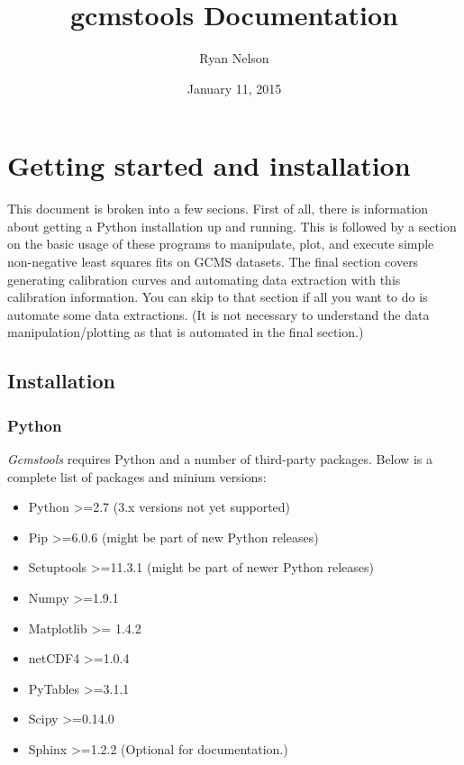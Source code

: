 \documentclass[letterpaper,10pt,english]{sphinxmanual}
\title{gcmstools Documentation}
\date{January 11, 2015}
\author{Ryan Nelson}
\begin{document}
\maketitle
\tableofcontents
{}\label{index::doc}



\chapter{Getting started and installation}
\label{intro:getting-started-and-installation}\label{intro:gcmstools-documentation}\label{intro::doc}
This document is broken into a few secions. First of all, there is information
about getting a Python installation up and running. This is followed by a
section on the basic usage of these programs to manipulate, plot, and execute
simple non-negative least squares fits on GCMS datasets. The final section
covers generating calibration curves and automating data extraction with this
calibration information. You can skip to that section if all you want to do is
automate some data extractions. (It is not necessary to understand the data
manipulation/plotting as that is automated in the final section.)


\section{Installation}
\label{intro:installation}

\subsection{Python}
\label{intro:python}
\emph{Gcmstools} requires Python and a number of third-party packages. Below is a
complete list of packages and minium versions:
\begin{itemize}
\item {} 
Python \textgreater{}=2.7 (3.x versions not yet supported)

\item {} 
Pip \textgreater{}=6.0.6 (might be part of new Python releases)

\item {} 
Setuptools \textgreater{}=11.3.1 (might be part of newer Python releases)

\item {} 
Numpy \textgreater{}=1.9.1

\item {} 
Matplotlib \textgreater{}= 1.4.2

\item {} 
netCDF4 \textgreater{}=1.0.4

\item {} 
PyTables \textgreater{}=3.1.1

\item {} 
Scipy \textgreater{}=0.14.0

\item {} 
Sphinx \textgreater{}=1.2.2 (Optional for documentation.)

\end{itemize}
\end{document}
